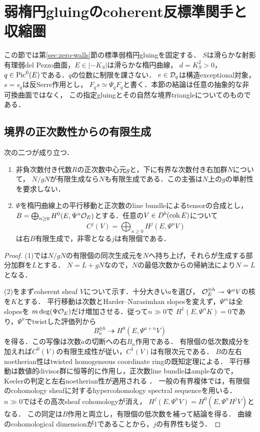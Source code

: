 \section{弱楕円gluingのcoherent反標準関手と収縮圏}\label{sec:coherent-contraction}
この節では第\ref{sec:zero-walls}節の標準弱楕円gluingを固定する．
$S$は滑らかな射影有理弱del Pezzo曲面，$E\in|-K_S|$は滑らかな楕円曲線，
$d=K_S^2>0$，$q\in\operatorname{Pic}^0(E)$である．$q$の位数に制限を課さない．
$e\in\mathcal D_q$は構造exceptional対象，$s=s_q$は反Serre作用とし，
$F_qs\simeq\Psi_qF_q$と書く．本節の結論は任意の抽象的な非可換曲面ではなく，
この指定gluingとその自然な境界triangleについてのものである．

\subsection{境界の正次数性からの有限生成}
\begin{lemma}[次数付きNakayamaと境界切断]\label{lem:graded-boundary-finiteness}
次の二つが成り立つ．
\begin{enumerate}
\item 非負次数付き代数$R$の正次数中心元$g$と，下に有界な次数付き右加群$N$について，
$N/gN$が有限生成なら$N$も有限生成である．この主張は$N$上の$g$の単射性を要求しない．
\item $\Psi$を楕円曲線上の平行移動と正次数のline bundleによるtensorの合成とし，
$B=\bigoplus_{n\ge0}H^0(E,\Psi^n\mathcal O_E)$とする．任意の$V\in D^b(\operatorname{coh} E)$について
\[
 C^j(V)=\bigoplus_{n\ge0}H^j(E,\Psi^nV)
\]
は右$B$有限生成で，非零となる$j$は有限個である．
\end{enumerate}
\end{lemma}
\begin{proof}
(1)では$N/gN$の有限個の同次生成元を$N$へ持ち上げ，それらが生成する部分加群を$L$とする．
$N=L+gN$なので，$N$の最低次数からの帰納法により$N=L$となる．

(2)をまずcoherent sheaf $V$について示す．十分大きい$a$を選び，
$\mathcal O_E^{\oplus h}\twoheadrightarrow\Psi^aV$の核を$K$とする．
平行移動は次数とHarder--Narasimhan slopesを変えず，$\Psi^m$は全slopesを
$m\deg(\Psi\mathcal O_E)$だけ増加させる．従って$n\gg0$で
$H^1(E,\Psi^nK)=0$であり，$\Psi^n$でtwistした評価列から
\[
 B_n^{\oplus h}\twoheadrightarrow H^0(E,\Psi^{a+n}V)
\]
を得る．この写像は次数$a$の切断への右$B_n$作用である．
有限個の低次数成分を加えれば$C^0(V)$の有限生成性が従い，$C^1(V)$は有限次元である．
$B$の左右noetherian性はtwisted homogeneous coordinate ringの既知定理による．
平行移動は数値的divisor群に恒等的に作用し，正次数line bundleはampleなので，
Keelerの判定と左右noetherian性が適用される
\cite[Theorem 1.2(1),(2)]{KeelerAmple}．
一般の有界複体では，有限個のcohomology sheafに対するhypercohomology spectral sequenceを用いる．
$n\gg0$ではその高次sheaf cohomologyが消え，
$H^j(E,\Psi^nV)=H^0(E,\Psi^nH^jV)$となる．
この同定は$B$作用と両立し，有限個の低次数を補って結論を得る．
曲線のcohomological dimensionが1であることから，$j$の有界性も従う．
\end{proof}

